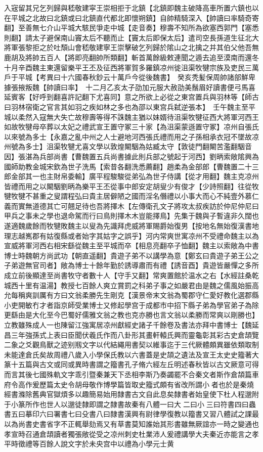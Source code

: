 入宼留其兄乞列歸與嵇敬建寜王崇相拒于北鎮【北鎮即魏主破降高車所置六鎮也以在平城之北故曰北鎮或曰北鎮直代都北即懷朔鎮】自帥精騎深入【帥讀曰率騎奇寄翻】至善無七介山平城大駭民爭走中城【走音奏】穆壽不知所為欲塞西郭門【塞悉則翻】請太子避保南山竇太后不聽而止【竇太后即保太后】遣司空長孫道生征北大將軍張黎拒之於吐頹山會嵇敬建寧王崇擊破乞列歸於隂山之北擒之并其伯父他吾無鹿胡及將帥五百人【將即亮翻帥所類翻】斬首萬餘級敕連聞之遁去追至漠南而還冬十月辛酉魏主東還留樂平王丕及征西將軍賀多羅鎮凉州徙沮渠牧犍宗族及吏民三萬戶于平城【考異曰十六國春秋鈔云十萬戶今從後魏書】　癸亥秃髪保周帥諸部鮮卑據張掖叛魏【帥讀曰率】　十二月乙亥太子劭加元服大赦劭美鬚眉好讀書便弓馬喜延賓客【好呼到翻喜許記翻下尤喜同】意之所欲上必從之東宫置兵與羽林等【師古曰羽林宿衛之官言其如羽之疾如林之多也為邵以東宫兵弑逆張本】　壬午魏主至平城以柔然入寇無大失亡故穆壽等得不誅魏主猶以妹婿待沮渠牧犍征西大將軍河西王如故牧犍母卒葬以太妃之禮武宣王置守冢三十家【為沮渠蒙遜置守冢】凉州自張氏以來號為多士【永嘉之亂中州之人士避地河西張氏禮而用之子孫相承衣冠不墜故凉州號為多士】沮渠牧犍尤喜文學以敦煌闞駰為姑臧太守【敦徒門翻闞苦濫翻駰音因】張湛為兵部尚書【曹魏置五兵尚書據此則兵部之號起于河西】劉昞索敞隂興為國師助教金城宋欽為世子洗馬【索昔各翻洗悉薦翻】趙柔為金部郎【曹魏置二十三郎金部其一也主財帛委輸】廣平程駿駿從弟弘為世子侍講【從才用翻】魏主克凉州皆禮而用之以闞駰劉昞為樂平王丕從事中郎安定胡叟少有俊才【少詩照翻】往從牧犍牧犍不甚重之叟謂程弘曰貴主居僻陋之國而淫名僭禮以小事大而心不純壹外慕仁義而實無道德其亡可翹足待也吾將擇木【左傳衛孔文子將攻太叔疾訪於仲尼仲尼曰甲兵之事未之學也退命駕而行曰鳥則擇木木豈能擇鳥】先集于魏與子暫違非久闊也遂適魏歲餘而牧犍敗魏主以叟為先識拜虎威將軍賜爵始復男【按地名無始復漢書地理志越嶲郡有姑復縣或者始字其姑字之誤乎】河内常爽世寓凉州不受禮命魏主以為宣威將軍河西右相宋繇從魏主至平城而卒【相息亮翻卒子恤翻】魏主以索敞為中書博士時魏朝方尚武功【朝直遥翻】貴遊子弟不以講學為意【鄭玄曰貴遊子弟王公之子弟遊無官司者】敞為博士十餘年勤於誘導肅而有禮【誘音酉】貴遊皆嚴憚之多所成立前後顯達至尚書牧守者數十人【守手又翻】常爽置館於温水之右【水經註桑乾城西十里有温湯】教授七百餘人爽立賞罰之科弟子事之如嚴君由是魏之儒風始振高允每稱爽訓厲有方曰文翁柔勝先生剛克【漢景帝末文翁為蜀郡守仁愛好教化選郡縣小吏開敏冇才者詣京師受業博士又修起學宫于成都市中招下縣子弟為學官弟子為除更繇由是大化至今巴蜀好儒雅文翁之教也克亦勝也言文翁以柔勝而常爽以剛勝也】立教雖殊成人一也陳留江強寓居凉州獻經史諸子千餘卷及書法亦拜中書博士【魏延昌三年強孫式上表曰臣聞伏羲氏作而八卦形其畫軒轅氏興而靈龜彰其彩古史倉頡覽二象之爻觀鳥獸之迹别剏文字以代結繩用書契以維事迄于三代厥體頗異雖依類取制未能達倉氏矣故周禮八歲入小學保氏教以六書蓋是史頡之遺法及宣王太史史籀著大篆十五篇與古文或同或異時書謂之籀書孔子脩六經左丘明述春秋皆以古文厥意可得而言其後七國殊軌文字乖引暨秦兼天下丞相李斯乃奏蠲罷不合秦文者斯作倉頡篇車府令高作爰歷篇太史令胡母敬作博學篇皆取史籀式頗有省改所謂小者也於是秦燒經書滌除舊典官獄煩多以趣簡易始用隸書古文自此息矣隸書者始皇使下杜人程邈附于小篆所作也世人以邈徒隸即謂之隸書故秦有八體一曰大二曰小三曰符書四曰蟲書五曰摹印六曰署書七曰殳書八曰隸書漢興有尉律學復教以籀書又習八體試之課最以為尚書史書省字不正輒舉劾焉又有草書莫知誰始其形書雖無厥誼亦一時之變通也孝宣時召通倉頡讀者獨張敞從受之凉州刺史杜業沛人爰禮講學大夫秦近亦能言之孝平時徵禮等百餘人說文字於未央宫中以禮為小學元士黄